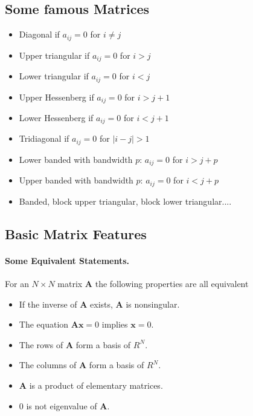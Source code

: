 \documentclass[%
oneside,                 %
final,                   %
10pt]{article}
\begin{document}
\subsection{Some famous Matrices}

\begin{itemize}
  \item Diagonal if $a_{ij}=0$ for $i\ne j$

  \item Upper triangular if $a_{ij}=0$ for $i > j$

  \item Lower triangular if $a_{ij}=0$ for $i < j$

  \item Upper Hessenberg if $a_{ij}=0$ for $i > j+1$

  \item Lower Hessenberg if $a_{ij}=0$ for $i < j+1$

  \item Tridiagonal if $a_{ij}=0$ for $|i -j| > 1$

  \item Lower banded with bandwidth $p$: $a_{ij}=0$ for $i > j+p$

  \item Upper banded with bandwidth $p$: $a_{ij}=0$ for $i < j+p$

  \item Banded, block upper triangular, block lower triangular....
\end{itemize}

\noindent
\subsection{Basic Matrix Features}


\paragraph{Some Equivalent Statements.}
For an $N\times N$ matrix  $\mathbf{A}$ the following properties are all equivalent

\begin{itemize}
  \item If the inverse of $\mathbf{A}$ exists, $\mathbf{A}$ is nonsingular.

  \item The equation $\mathbf{Ax}=0$ implies $\mathbf{x}=0$.

  \item The rows of $\mathbf{A}$ form a basis of $R^N$.

  \item The columns of $\mathbf{A}$ form a basis of $R^N$.

  \item $\mathbf{A}$ is a product of elementary matrices.

  \item $0$ is not eigenvalue of $\mathbf{A}$.
\end{itemize}
\end{document}
